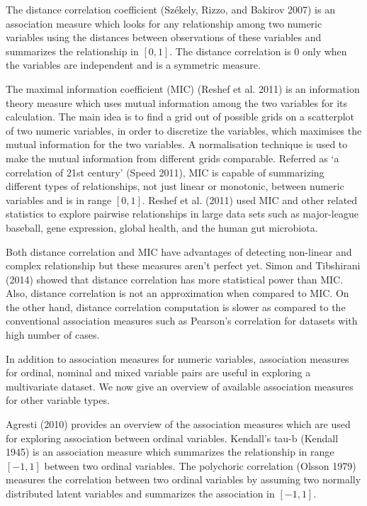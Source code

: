 The distance correlation coefficient (Székely, Rizzo, and Bakirov 2007) is an association measure which looks for any relationship among two numeric variables using the distances between observations of these variables and summarizes the relationship in \([0,1]\). The distance correlation is \(0\) only when the variables are independent and is a symmetric measure.

The maximal information coefficient (MIC) (Reshef et al. 2011) is an information theory measure which uses mutual information among the two variables for its calculation. The main idea is to find a grid out of possible grids on a scatterplot of two numeric variables, in order to discretize the variables, which maximises the mutual information for the two variables. A normalisation technique is used to make the mutual information from different grids comparable. Referred as `a correlation of 21st century' (Speed 2011), MIC is capable of summarizing different types of relationships, not just linear or monotonic, between numeric variables and is in range \([0,1]\). Reshef et al. (2011) used MIC and other related statistics to explore pairwise relationships in large data sets such as major-league baseball, gene expression, global health, and the human gut microbiota.

Both distance correlation and MIC have advantages of detecting non-linear and complex relationship but these measures aren't perfect yet. Simon and Tibshirani (2014) showed that distance correlation has more statistical power than MIC. Also, distance correlation is not an approximation when compared to MIC. On the other hand, distance correlation computation is slower as compared to the conventional association measures such as Pearson's correlation for datasets with high number of cases.

In addition to association measures for numeric variables, association measures for ordinal, nominal and mixed variable pairs are useful in exploring a multivariate dataset. We now give an overview of available association measures for other variable types.

Agresti (2010) provides an overview of the association measures which are used for exploring association between ordinal variables. Kendall's tau-b (Kendall 1945) is an association measure which summarizes the relationship in range \([-1,1]\) between two ordinal variables. The polychoric correlation (Olsson 1979) measures the correlation between two ordinal variables by assuming two normally distributed latent variables and summarizes the association in \([-1,1]\).

